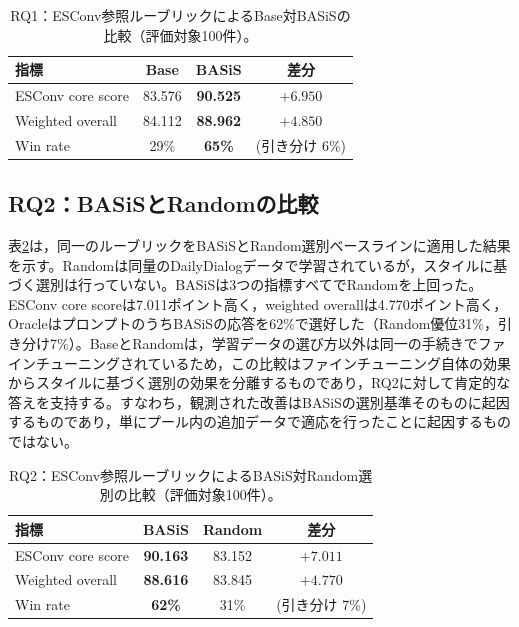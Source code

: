 \documentclass[manuscript,review,anonymous]{acmart}
\begin{document}
\begin{table}[t]
  \caption{RQ1：ESConv参照ルーブリックによるBase対BASiSの比較（評価対象100件）。}
  \label{tab:base_vs_basis}
  \begin{tabular}{lccc}
    \toprule
    指標 & Base & BASiS & 差分 \\
    \midrule
    ESConv core score  & 83.576 & \textbf{90.525} & $+6.950$ \\
    Weighted overall    & 84.112 & \textbf{88.962} & $+4.850$ \\
    Win rate             & 29\%   & \textbf{65\%}   & (引き分け 6\%) \\
    \bottomrule
  \end{tabular}
\end{table}

\subsection{RQ2：BASiSとRandomの比較}
表\ref{tab:basis_vs_random}は，同一のルーブリックをBASiSとRandom選別ベースラインに適用した結果を示す。Randomは同量のDailyDialogデータで学習されているが，スタイルに基づく選別は行っていない。BASiSは3つの指標すべてでRandomを上回った。ESConv core scoreは7.011ポイント高く，weighted overallは4.770ポイント高く，OracleはプロンプトのうちBASiSの応答を62\%で選好した（Random優位31\%，引き分け7\%）。BaseとRandomは，学習データの選び方以外は同一の手続きでファインチューニングされているため，この比較はファインチューニング自体の効果からスタイルに基づく選別の効果を分離するものであり，RQ2に対して肯定的な答えを支持する。すなわち，観測された改善はBASiSの選別基準そのものに起因するものであり，単にプール内の追加データで適応を行ったことに起因するものではない。

\begin{table}[t]
  \caption{RQ2：ESConv参照ルーブリックによるBASiS対Random選別の比較（評価対象100件）。}
  \label{tab:basis_vs_random}
  \begin{tabular}{lccc}
    \toprule
    指標 & BASiS & Random & 差分 \\
    \midrule
    ESConv core score  & \textbf{90.163} & 83.152 & $+7.011$ \\
    Weighted overall    & \textbf{88.616} & 83.845 & $+4.770$ \\
    Win rate             & \textbf{62\%}   & 31\%   & (引き分け 7\%) \\
    \bottomrule
  \end{tabular}
\end{table}
\end{document}

